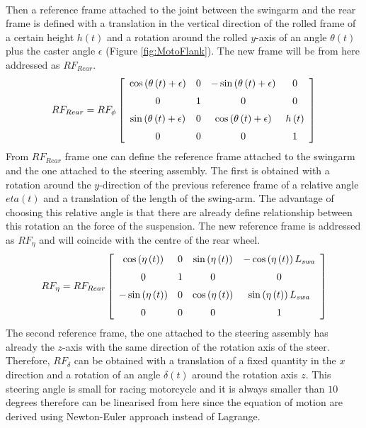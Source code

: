 %
\\
%
Then a reference frame attached to the joint between the swingarm and the rear frame is defined with a translation in the vertical direction of the rolled frame of a certain height $h(t)$ and a rotation around the rolled $y$-axis of an angle $\theta(t)$ plus the caster angle $\epsilon$ (Figure \ref{fig:MotoFlank}). The new frame will be from here addressed as $RF_{Rear}$.
%
\begin{equation}
    RF_{Rear} = RF_\phi 
    \left[ \begin {array}{cccc} \cos \left( \theta \left( t \right) +
    \epsilon \right) &0&-\sin \left( \theta \left( t \right) +\epsilon
    \right) &0\\ \noalign{\medskip}0&1&0&0\\ \noalign{\medskip}\sin
    \left( \theta \left( t \right) +\epsilon \right) &0&\cos \left( 
    \theta \left( t \right) +\epsilon \right) &h \left( t \right) 
    \\ \noalign{\medskip}0&0&0&1\end {array} \right] 
\end{equation}
%
From $RF_{Rear}$ frame one can define the reference frame attached to the swingarm and the one attached to the steering assembly. The first is obtained with a rotation around the $y$-direction of the previous reference frame of a relative angle $eta(t)$ and a translation of the length of the swing-arm. The advantage of choosing this relative angle is that there are already define relationship between this rotation an the force of the suspension. The new reference frame is addressed as $RF_\eta$ and will coincide with the centre of the rear wheel.
%
\begin{equation}
    RF_{\eta} = RF_{Rear} 
    \left[ \begin {array}{cccc} \cos \left( \eta \left( t \right) 
    \right) &0&\sin \left( \eta \left( t \right)  \right) &-\cos \left( 
    \eta \left( t \right)  \right) L_{{\it swa}}\\ \noalign{\medskip}0&1&0
    &0\\ \noalign{\medskip}-\sin \left( \eta \left( t \right)  \right) &0&
    \cos \left( \eta \left( t \right)  \right) &\sin \left( \eta \left( t
    \right)  \right) L_{{\it swa}}\\ \noalign{\medskip}0&0&0&1
    \end {array} \right]
\end{equation}
%
The second reference frame, the one attached to the steering assembly has already the $z$-axis with the same direction of the rotation axis of the steer. Therefore, $RF_\delta$ can be obtained with a translation of a fixed quantity in the $x$ direction and a rotation of an angle $\delta(t)$ around the rotation axis $z$. This steering angle is small for racing motorcycle and it is always smaller than $10$ degrees therefore can be linearised from here since the equation of motion are derived using Newton-Euler approach instead of Lagrange.
